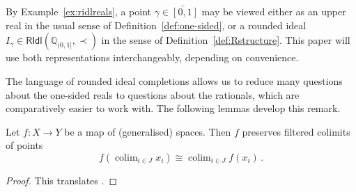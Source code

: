 \documentclass[a4paper, 11pt,reqno]{amsart}
\newcommand{\qint}{\mathbb{Q}_{(0,1]}}
\newcommand{\RIdl}{\mathsf{RIdl}}
\DeclareMathOperator*{\colim}{colim}
\begin{document}
\begin{convention}\label{conv:[0,1]ridl} By Example~\ref{ex:ridlreals}, a point $\gamma\in\overleftarrow{[0,1]}$ may be viewed either as an upper real in the usual sense of Definition~\ref{def:one-sided}, or a rounded ideal $I_\gamma\in\RIdl(\qint,\prec)$ in the sense of Definition~\ref{def:Rstructure}. This paper will use both representations interchangeably, depending on convenience.
	
\end{convention}


The language of rounded ideal completions allows us to reduce many questions about the one-sided reals to questions about the rationals, which are comparatively easier to work with. The following lemmas develop this remark.

\begin{lemma}\label{lem:filteredCOLIMITpts} Let $f\colon X\rightarrow Y$ be a map of (generalised) spaces. Then $f$ preserves filtered colimits of points
	$$f(\colim_{i\in J} x_i)\cong \colim_{i\in J} f(x_i)\,.$$
\end{lemma}
\begin{proof} This translates \cite[Theorem 1.37]{Vi07}.
\end{proof}

\end{document}
